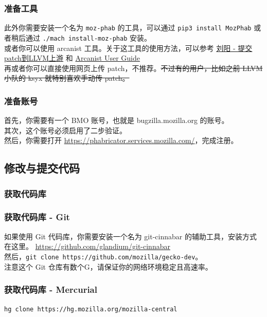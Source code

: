 \documentclass[UTF-8]{ctexbeamer}
\begin{document}
\begin{frame}[fragile]
	\frametitle{准备工具}
	此外你需要安装一个名为 \verb|moz-phab| 的工具，可以通过 \verb|pip3 install MozPhab| 或者稍后通过 \verb|./mach install-moz-phab| 安装。\\
	或者你可以使用 arcanist 工具。关于这工具的使用方法，可以参考 \href{https://www.bilibili.com/video/BV14m4y1D7ZM}{刘阳 - 提交patch到LLVM上游} 和 \href{https://moz-conduit.readthedocs.io/en/latest/arcanist-user.html}{Arcanist User Guide} \\
	再或者你可以直接使用网页上传 patch，不推荐。\sout{不过有的用户，比如之前 LLVM 小队的 ksyx 就特别喜欢手动传 patch。}

\end{frame}

\begin{frame}[fragile]
	\frametitle{准备账号}

	首先，你需要有一个 BMO 账号，也就是 bugzilla.mozilla.org 的账号。\\
	其次，这个账号必须启用了二步验证。\\
	然后，你需要打开 \url{https://phabricator.services.mozilla.com/}，完成注册。

\end{frame}

\subsection{修改与提交代码}
\subsubsection{获取代码库}
\begin{frame}[fragile]
	\frametitle{获取代码库 - Git}
	如果使用 Git 代码库，你需要安装一个名为 git-cinnabar 的辅助工具，安装方式在这里。 \url{https://github.com/glandium/git-cinnabar} \\

	然后，\verb|git clone https://github.com/mozilla/gecko-dev|。\\

	注意这个 Git 仓库有数个G，请保证你的网络环境稳定且高速率。

\end{frame}

\begin{frame}[fragile]
	\frametitle{获取代码库 - Mercurial}

	\verb|hg clone https://hg.mozilla.org/mozilla-central|

\end{frame}
\end{document}
